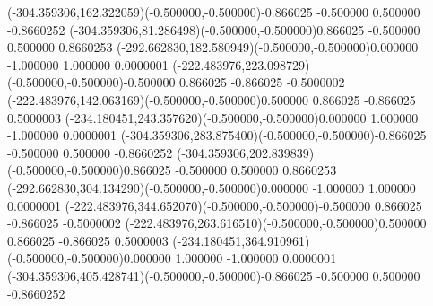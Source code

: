 \fontsize{12.000000}{14.400000}\selectfont
\ASYalignT(-304.359306,162.322059)(-0.500000,-0.500000){-0.866025 -0.500000 0.500000 -0.866025}{2}%
\color{ASYcolor}
\fontsize{12.000000}{14.400000}\selectfont
\ASYalignT(-304.359306,81.286498)(-0.500000,-0.500000){0.866025 -0.500000 0.500000 0.866025}{3}%
\color{ASYcolor}
\fontsize{12.000000}{14.400000}\selectfont
\ASYalignT(-292.662830,182.580949)(-0.500000,-0.500000){0.000000 -1.000000 1.000000 0.000000}{1}%
\color{ASYcolor}
\fontsize{12.000000}{14.400000}\selectfont
\ASYalignT(-222.483976,223.098729)(-0.500000,-0.500000){-0.500000 0.866025 -0.866025 -0.500000}{2}%
\color{ASYcolor}
\fontsize{12.000000}{14.400000}\selectfont
\ASYalignT(-222.483976,142.063169)(-0.500000,-0.500000){0.500000 0.866025 -0.866025 0.500000}{3}%
\color{ASYcolor}
\fontsize{12.000000}{14.400000}\selectfont
\ASYalignT(-234.180451,243.357620)(-0.500000,-0.500000){0.000000 1.000000 -1.000000 0.000000}{1}%
\color{ASYcolor}
\fontsize{12.000000}{14.400000}\selectfont
\ASYalignT(-304.359306,283.875400)(-0.500000,-0.500000){-0.866025 -0.500000 0.500000 -0.866025}{2}%
\color{ASYcolor}
\fontsize{12.000000}{14.400000}\selectfont
\ASYalignT(-304.359306,202.839839)(-0.500000,-0.500000){0.866025 -0.500000 0.500000 0.866025}{3}%
\color{ASYcolor}
\fontsize{12.000000}{14.400000}\selectfont
\ASYalignT(-292.662830,304.134290)(-0.500000,-0.500000){0.000000 -1.000000 1.000000 0.000000}{1}%
\color{ASYcolor}
\fontsize{12.000000}{14.400000}\selectfont
\ASYalignT(-222.483976,344.652070)(-0.500000,-0.500000){-0.500000 0.866025 -0.866025 -0.500000}{2}%
\color{ASYcolor}
\fontsize{12.000000}{14.400000}\selectfont
\ASYalignT(-222.483976,263.616510)(-0.500000,-0.500000){0.500000 0.866025 -0.866025 0.500000}{3}%
\color{ASYcolor}
\fontsize{12.000000}{14.400000}\selectfont
\ASYalignT(-234.180451,364.910961)(-0.500000,-0.500000){0.000000 1.000000 -1.000000 0.000000}{1}%
\color{ASYcolor}
\fontsize{12.000000}{14.400000}\selectfont
\ASYalignT(-304.359306,405.428741)(-0.500000,-0.500000){-0.866025 -0.500000 0.500000 -0.866025}{2}%
\color{ASYcolor}
\fontsize{12.000000}{14.400000}\selectfont
